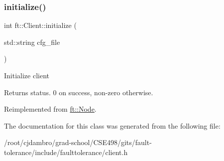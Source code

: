 \subsubsection{\texorpdfstring{initialize()}{initialize()}}
{\footnotesize\ttfamily int ft\+::\+Client\+::initialize (\begin{DoxyParamCaption}\item[{std\+::string}]{cfg\+\_\+file }\end{DoxyParamCaption})\hspace{0.3cm}{\ttfamily [virtual]}}

Initialize client

\begin{DoxyReturn}{Returns}
status. 0 on success, non-\/zero otherwise. 
\end{DoxyReturn}


Reimplemented from \mbox{\hyperlink{classft_1_1Node_addc92fd2c5cae12a8ea68c30b7202e91}{ft\+::\+Node}}.



The documentation for this class was generated from the following file\+:\begin{DoxyCompactItemize}
\item 
/root/cjdambro/grad-\/school/\+C\+S\+E498/gits/fault-\/tolerance/include/faulttolerance/client.\+h\end{DoxyCompactItemize}
